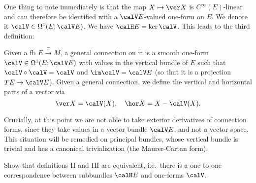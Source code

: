 One thing to note immediately is that the map $X\mapsto \ver X$ is  $C^\infty(E)$-linear and can therefore be identified with a $\calV E$-valued one-form on $E$. We denote it $\calV\in\Omega^1(E;\calV E)$. We have $\calH E=\ker \calV$. This leads to the third definition:

\begin{defn}
    Given a \gls{fb} $E\overset{\pi}{\to}M$, a general connection on it is a smooth one-form $\calV\in\Omega^1(E;\calV E)$ with values in the vertical bundle of $E$ such that $\calV\circ\calV=\calV$ and $\im\calV=\calV E$ (so that it is a projection $TE\to \calV E$). Given a general connection, we define the vertical and horizontal parts of a vector via
    \[\ver X=\calV(X),\quad \hor X=X-\calV(X).\]
\end{defn}

\begin{xca}
    Crucially, at this point we are not able to take exterior derivatives of connection forms, since they take values in a vector bundle $\calV E$, and not a vector space. This situation will be remedied on principal bundles, whose vertical bundle is trivial and has a canonical trivialization (the Maurer-Cartan form).
\end{xca}

\begin{xca}
    Show that definitions II and III are equivalent, i.e.\ there is a one-to-one correspondence between subbundles $\calH E$ and one-forms $\calV$.
\end{xca}


